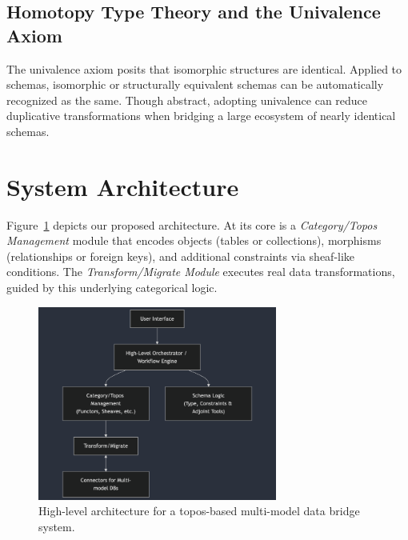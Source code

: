 \documentclass[11pt]{article}
\begin{document}
\subsection{Homotopy Type Theory and the Univalence Axiom}
The univalence axiom posits that isomorphic structures are identical. Applied to schemas, isomorphic or structurally equivalent schemas can be automatically recognized as the same. Though abstract, adopting univalence can reduce duplicative transformations when bridging a large ecosystem of nearly identical schemas.

\section{System Architecture}
Figure~\ref{fig:architecture} depicts our proposed architecture. At its core is a \emph{Category/Topos Management} module that encodes objects (tables or collections), morphisms (relationships or foreign keys), and additional constraints via sheaf-like conditions. The \emph{Transform/Migrate Module} executes real data transformations, guided by this underlying categorical logic.

\begin{figure}[h]
\centering
\includegraphics[width=0.7\textwidth]{architecture.png}
\caption{High-level architecture for a topos-based multi-model data bridge system.}
\label{fig:architecture}
\end{figure}
\end{document}
